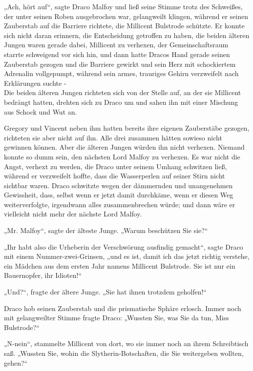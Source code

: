 {„Ach, hört auf“, sagte Draco Malfoy und ließ seine Stimme trotz des Schweißes, der unter seinen Roben ausgebrochen war, gelangweilt klingen, während er seinen Zauberstab auf die Barriere richtete, die Millicent Bulstrode schützte. Er konnte sich nicht daran erinnern, die Entscheidung getroffen zu haben, die beiden älteren Jungen waren gerade dabei, Millicent zu verhexen, der Gemeinschaftsraum starrte schweigend vor sich hin, und dann hatte Dracos Hand gerade seinen Zauberstab gezogen und die Barriere gewirkt und sein Herz mit schockiertem Adrenalin vollgepumpt, während sein armes, trauriges Gehirn verzweifelt nach Erklärungen suchte -\\ Die beiden älteren Jungen richteten sich von der Stelle auf, an der sie Millicent bedrängt hatten, drehten sich zu Draco um und sahen ihn mit einer Mischung aus Schock und Wut an.

Gregory und Vincent neben ihm hatten bereits ihre eigenen Zauberstäbe gezogen, richteten sie aber nicht auf ihn. Alle drei zusammen hätten sowieso nicht gewinnen können. Aber die älteren Jungen würden ihn nicht verhexen. Niemand konnte so dumm sein, den nächsten Lord Malfoy zu verhexen. Es war nicht die Angst, verhext zu werden, die Draco unter seinem Umhang schwitzen ließ, während er verzweifelt hoffte, dass die Wasserperlen auf seiner Stirn nicht sichtbar waren. Draco schwitzte wegen der dämmernden und unangenehmen Gewissheit, dass, selbst wenn er jetzt damit durchkäme, wenn er diesen Weg weiterverfolgte, irgendwann alles zusammenbrechen würde; und dann wäre er vielleicht nicht mehr der nächste Lord Malfoy.

„Mr. Malfoy“, sagte der älteste Junge. „Warum beschützen Sie sie?“

„Ihr habt also die Urheberin der Verschwörung ausfindig gemacht“, sagte Draco mit einem Nummer-zwei-Grinsen, „und es ist, damit ich das jetzt richtig verstehe, ein Mädchen aus dem ersten Jahr namens Millicent Bulstrode. Sie ist nur ein Bauernopfer, ihr Idioten!“

„Und?“, fragte der ältere Junge. „Sie hat ihnen trotzdem geholfen!“

Draco hob seinen Zauberstab und die prismatische Sphäre erlosch. Immer noch mit gelangweilter Stimme fragte Draco: „Wussten Sie, was Sie da tun, Miss Bulstrode?“

„N-nein“, stammelte Millicent von dort, wo sie immer noch an ihrem Schreibtisch saß. „Wussten Sie, wohin die Slytherin-Botschaften, die Sie weitergeben wollten, gehen?“

}
